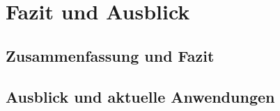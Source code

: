\section{Fazit und Ausblick} \label{section:Fazit_und_Ausblick}
\subsection{Zusammenfassung und Fazit}
\subsection{Ausblick und aktuelle Anwendungen}
